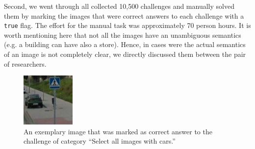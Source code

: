\documentclass[sigconf,review,anonymous]{acmart}
\begin{document}
Second, we went through all collected 10,500 challenges and manually solved them by marking the images that were correct answers to each challenge with a \texttt{true} flag. The effort for the manual task was approximately 70 person hours. It is worth mentioning here that not all the images have an unambiguous semantics (e.g. a building can have also a store). Hence, in cases were the actual semantics of an image is not completely clear, we directly discussed them between the pair of researchers.

\begin{figure}[t]
\centering
\includegraphics[width=0.5\columnwidth]{images/car.jpg}
\caption{An exemplary image that was marked as correct answer to the challenge of category ``Select all images with cars.''}
\label{image-example}
\end{figure}
\end{document}

